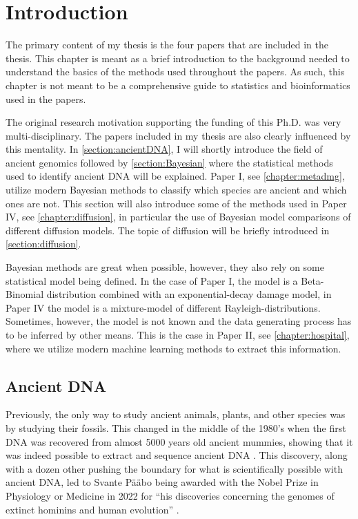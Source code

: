 
\chapter{Introduction}
The primary content of my thesis is the four papers that are included in the thesis. This chapter is meant as a brief introduction to the background needed to understand the basics of the methods used throughout the papers. As such, this chapter is not meant to be a comprehensive guide to statistics and bioinformatics used in the papers.

The original research motivation supporting the funding of this Ph.D. was very multi-disciplinary. The papers included in my thesis are also clearly influenced by this mentality. In \autoref{section:ancientDNA}, I will shortly introduce the field of ancient genomics followed by \autoref{section:Bayesian} where the statistical methods used to identify ancient DNA will be explained. Paper I, see \autoref{chapter:metadmg}, utilize modern Bayesian methods to classify which species are ancient and which ones are not. This section will also introduce some of the methods used in Paper IV, see \autoref{chapter:diffusion}, in particular the use of Bayesian model comparisons of different diffusion models. The topic of diffusion will be briefly introduced in \autoref{section:diffusion}.

Bayesian methods are great when possible, however, they also rely on some statistical model being defined. In the case of Paper I, the model is a Beta-Binomial distribution combined with an exponential-decay damage model, in Paper IV the model is a mixture-model of different Rayleigh-distributions. Sometimes, however, the model is not known and the data generating process has to be inferred by other means. This is the case in Paper II, see \autoref{chapter:hospital}, where we utilize modern machine learning methods to extract this information.


\section{Ancient DNA}
\label{section:ancientDNA}

Previously, the only way to study ancient animals, plants, and other species was by studying their fossils. This changed in the middle of the 1980's when the first DNA was recovered from almost 5000 years old ancient mummies, showing that it was indeed possible to extract and sequence ancient DNA \autocite{paaboMolecularCloningAncient1985,paaboPreservationDNAAncient1985}. This discovery, along with a dozen other pushing the boundary for what is scientifically possible with ancient DNA, led to Svante Pääbo being awarded with the Nobel Prize in Physiology or Medicine in 2022 for ``his discoveries concerning the genomes of extinct hominins and human evolution'' \autocite{thenobelassemblyatkarolinskainstitutetNobelPrizePhysiology2022}.

